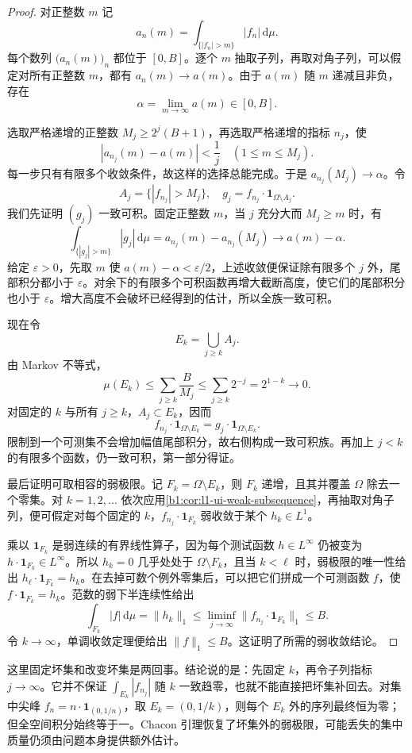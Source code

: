 \begin{proof}
对正整数 \(m\) 记
\[
  a_n(m)=\int_{\{|f_n|>m\}}|f_n|\,\mathrm d\mu.
\]
每个数列 \(\bigl(a_n(m)\bigr)_n\) 都位于 \([0,B]\)。逐个 \(m\) 抽取子列，再取对角子列，可以假定对所有正整数 \(m\)，都有 \(a_n(m)\to a(m)\)。由于 \(a(m)\) 随 \(m\) 递减且非负，存在
\[
  \alpha=\lim_{m\to\infty}a(m)\in[0,B].
\]

选取严格递增的正整数 \(M_j\geq2^j(B+1)\)，再选取严格递增的指标 \(n_j\)，使
\[
  |a_{n_j}(m)-a(m)|<\frac1j
  \quad(1\leq m\leq M_j).
\]
每一步只有有限多个收敛条件，故这样的选择总能完成。于是 \(a_{n_j}(M_j)\to\alpha\)。令
\[
  A_j=\{|f_{n_j}|>M_j\},\quad
  g_j=f_{n_j}\cdot\mathbf1_{\Omega\setminus A_j}.
\]
我们先证明 \((g_j)\) 一致可积。固定正整数 \(m\)，当 \(j\) 充分大而 \(M_j\geq m\) 时，有
\[
  \int_{\{|g_j|>m\}}|g_j|\,\mathrm d\mu
  =a_{n_j}(m)-a_{n_j}(M_j)
  \longrightarrow a(m)-\alpha.
\]
给定 \(\varepsilon>0\)，先取 \(m\) 使 \(a(m)-\alpha<\varepsilon/2\)，上述收敛便保证除有限多个 \(j\) 外，尾部积分都小于 \(\varepsilon\)。对余下的有限多个可积函数再增大截断高度，使它们的尾部积分也小于 \(\varepsilon\)。增大高度不会破坏已经得到的估计，所以全族一致可积。

现在令
\[
  E_k=\bigcup_{j\geq k}A_j.
\]
由 Markov 不等式，
\[
  \mu(E_k)\leq\sum_{j\geq k}\frac{B}{M_j}
  \leq\sum_{j\geq k}2^{-j}=2^{1-k}\longrightarrow0.
\]
对固定的 \(k\) 与所有 \(j\geq k\)，\(A_j\subset E_k\)，因而
\[
  f_{n_j}\cdot\mathbf1_{\Omega\setminus E_k}
  =g_j\cdot\mathbf1_{\Omega\setminus E_k}.
\]
限制到一个可测集不会增加幅值尾部积分，故右侧构成一致可积族。再加上 \(j<k\) 的有限多个函数，仍一致可积，第一部分得证。

最后证明可取相容的弱极限。记 \(F_k=\Omega\setminus E_k\)，则 \(F_k\) 递增，且其并覆盖 \(\Omega\) 除去一个零集。对 \(k=1,2,\ldots\) 依次应用\cref{b1:cor:l1-ui-weak-subsequence}，再抽取对角子列，便可假定对每个固定的 \(k\)，\(f_{n_j}\cdot\mathbf1_{F_k}\) 弱收敛于某个 \(h_k\in L^1\)。

乘以 \(\mathbf1_{F_k}\) 是弱连续的有界线性算子，因为每个测试函数 \(h\in L^\infty\) 仍被变为 \(h\cdot\mathbf1_{F_k}\in L^\infty\)。所以 \(h_k=0\) 几乎处处于 \(\Omega\setminus F_k\)，且当 \(k<\ell\) 时，弱极限的唯一性给出 \(h_\ell\cdot\mathbf1_{F_k}=h_k\)。在去掉可数个例外零集后，可以把它们拼成一个可测函数 \(f\)，使 \(f\cdot\mathbf1_{F_k}=h_k\)。范数的弱下半连续性给出
\[
  \int_{F_k}|f|\,\mathrm d\mu=\|h_k\|_1
  \leq\liminf_{j\to\infty}\|f_{n_j}\cdot\mathbf1_{F_k}\|_1\leq B.
\]
令 \(k\to\infty\)，单调收敛定理便给出 \(\|f\|_1\leq B\)。这证明了所需的弱收敛结论。
\end{proof}

这里固定坏集和改变坏集是两回事。结论说的是：先固定 \(k\)，再令子列指标 \(j\to\infty\)。它并不保证 \(\int_{E_k}|f_{n_j}|\) 随 \(k\) 一致趋零，也就不能直接把坏集补回去。对集中尖峰 \(f_n=n\cdot\mathbf1_{(0,1/n)}\)，取 \(E_k=(0,1/k)\)，则每个 \(E_k\) 外的序列最终恒为零；但全空间积分始终等于一。Chacon 引理恢复了坏集外的弱极限，可能丢失的集中质量仍须由问题本身提供额外估计。
